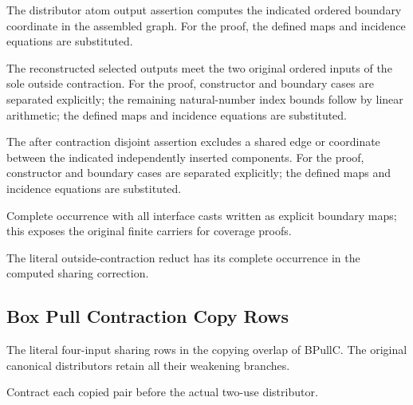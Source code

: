 The distributor atom output assertion computes the indicated ordered boundary coordinate in the assembled graph.
For the proof, the defined maps and incidence equations are substituted.
\par{}

The reconstructed selected outputs meet the two original ordered inputs of the sole outside contraction.
For the proof, constructor and boundary cases are separated explicitly; the remaining natural-number index bounds follow by linear arithmetic; the defined maps and incidence equations are substituted.
\par{}

The after contraction disjoint assertion excludes a shared edge or coordinate between the indicated independently inserted components.
For the proof, constructor and boundary cases are separated explicitly; the defined maps and incidence equations are substituted.
\par{}

Complete occurrence with all interface casts written as explicit boundary maps; this exposes the original finite carriers for coverage proofs.
\par{}

The literal outside-contraction reduct has its complete occurrence in the computed sharing correction.
\par{}

\subsection{Box Pull Contraction Copy Rows}
The literal four-input sharing rows in the copying overlap of BPullC. The original canonical distributors retain all their weakening branches.

Contract each copied pair before the actual two-use distributor.
\par{}

